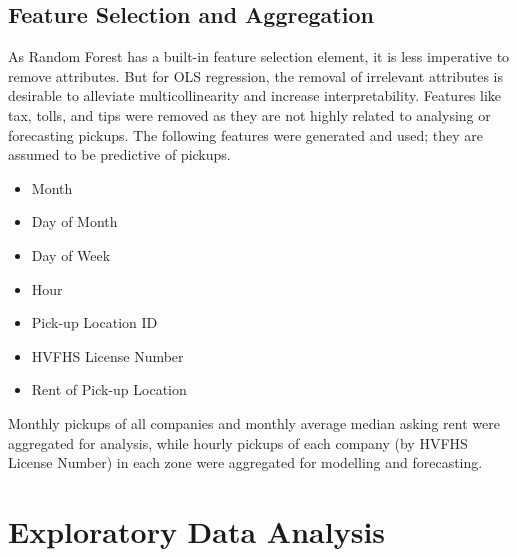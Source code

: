 \documentclass[11pt]{article}
\begin{document}
\subsection{Feature Selection and Aggregation}

As Random Forest has a built-in feature selection element, it is less imperative to remove attributes. But for OLS regression, the removal of irrelevant attributes is desirable to alleviate multicollinearity and increase interpretability. Features like tax, tolls, and tips were removed as they are not highly related to analysing or forecasting pickups. The following features were generated and used; they are assumed to be predictive of pickups.

\begin{multicols}{3}
\begin{itemize}
    \item Month
    \item Day of Month
    \item Day of Week
    \item Hour
    \item Pick-up Location ID
    \item HVFHS License Number
    \item Rent of Pick-up Location
\end{itemize}
\end{multicols}

Monthly pickups of all companies and monthly average median asking rent were aggregated for analysis, while hourly pickups of each company (by HVFHS License Number)  in each zone were aggregated for modelling and forecasting.

\section{Exploratory Data Analysis}
\end{document}
